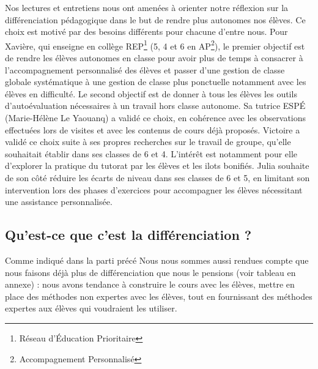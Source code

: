 Nos lectures et entretiens nous ont amenées à orienter notre réflexion sur la différenciation pédagogique dans le but de rendre plus autonomes nos élèves. Ce choix est motivé par des besoins différents pour chacune d’entre nous. Pour Xavière, qui enseigne en collège REP\footnote{Réseau d'Éducation Prioritaire} (5, 4 et 6 en AP\footnote{Accompagnement Personnalisé}),  le premier objectif est de rendre les élèves autonomes en classe pour avoir plus de temps à consacrer à l’accompagnement personnalisé des élèves et passer d’une gestion de classe globale systématique à une gestion de classe plus ponctuelle notamment avec les élèves en difficulté. Le second objectif est de donner à tous les élèves les outils d’autoévaluation nécessaires à un travail hors classe autonome. Sa tutrice ESPÉ (Marie-Hélène Le Yaouanq) a validé ce choix, en cohérence avec les observations effectuées lors de visites et avec les contenus de cours déjà proposés. Victoire a validé ce choix suite à ses propres recherches sur le travail de groupe, qu’elle souhaitait établir dans ses classes de 6 et 4. L’intérêt est notamment pour elle d’explorer la pratique du tutorat par les élèves et les ilots bonifiés. Julia souhaite de son côté réduire les écarts de niveau dans ses classes de 6 et 5, en limitant son intervention lors des phases d’exercices pour accompagner les élèves nécessitant une assistance personnalisée.

\subsection{Qu'est-ce que c'est la différenciation ?}
Comme indiqué dans la parti précé
Nous nous sommes aussi rendues compte que nous faisons déjà plus de différenciation que nous le pensions (voir tableau en annexe) : nous avons tendance à construire le cours avec les élèves, mettre en place des méthodes non expertes avec les élèves, tout en fournissant des méthodes expertes aux élèves qui voudraient les utiliser.



